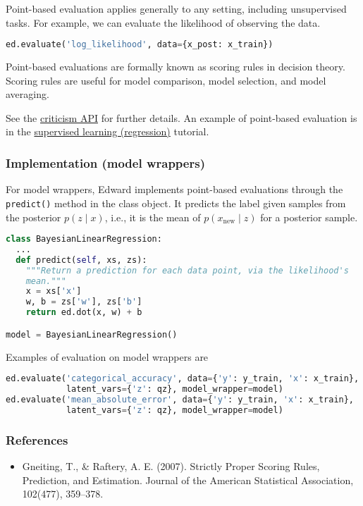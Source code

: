 Point-based evaluation applies generally to any setting, including
unsupervised tasks. For example, we can evaluate the likelihood of
observing the data.
\begin{lstlisting}[language=Python]
ed.evaluate('log_likelihood', data={x_post: x_train})
\end{lstlisting}

Point-based evaluations are formally known as scoring rules
in decision theory. Scoring rules are useful for model comparison, model
selection, and model averaging.

See the \href{api/criticisms.html}{criticism API} for further details.
An example of point-based evaluation is in the
\href{tut_supervised_regression.html}{supervised learning
(regression)} tutorial.

\subsubsection{Implementation (model wrappers)}

For model wrappers, Edward implements point-based evaluations through
the \texttt{predict()} method in the class object. It predicts
the label given samples from the posterior $p(z \mid x)$, i.e., it is
the mean of $p(x_\text{new} \mid z)$ for a posterior sample.
\begin{lstlisting}[language=Python]
class BayesianLinearRegression:
  ...
  def predict(self, xs, zs):
    """Return a prediction for each data point, via the likelihood's
    mean."""
    x = xs['x']
    w, b = zs['w'], zs['b']
    return ed.dot(x, w) + b

model = BayesianLinearRegression()
\end{lstlisting}
Examples of evaluation on model wrappers are
\begin{lstlisting}[language=Python]
ed.evaluate('categorical_accuracy', data={'y': y_train, 'x': x_train},
            latent_vars={'z': qz}, model_wrapper=model)
ed.evaluate('mean_absolute_error', data={'y': y_train, 'x': x_train},
            latent_vars={'z': qz}, model_wrapper=model)
\end{lstlisting}

\subsubsection{References}\label{references}

\begin{itemize}
\item
  Gneiting, T., & Raftery, A. E. (2007). Strictly Proper Scoring
  Rules, Prediction, and Estimation. Journal of the American
  Statistical Association, 102(477), 359–378.
\end{itemize}
